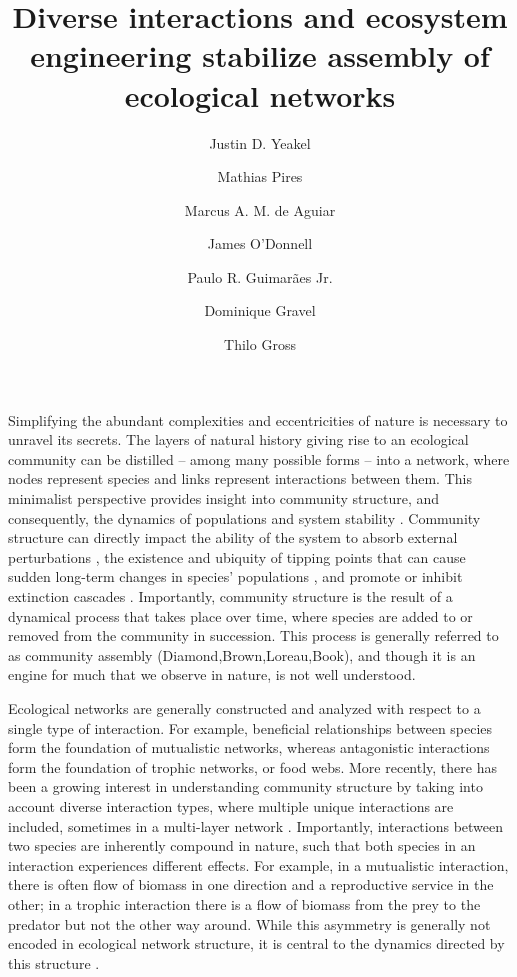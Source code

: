 \documentclass[9pt,twocolumn,twoside]{pnas-new}
\title{Diverse interactions and ecosystem engineering stabilize assembly of ecological networks}
\author[a,b]{Justin D. Yeakel}
\author[c]{Mathias Pires}
\author[c]{Marcus A. M. de Aguiar}
\author[d]{James O'Donnell}
\author[e]{Paulo R. Guimar\~aes Jr.}
\author[f]{Dominique Gravel}
\author[g]{Thilo Gross}
\affil[a]{School of Natural Sciences, University of California Merced, Merced, CA 95343, USA}
\affil[b]{Santa Fe Institute}
\affil[c]{Universidade Estadual de Campinas}
\affil[d]{University of Washington}
\affil[e]{Universidade de S\~ao Paulo}
\affil[f]{Universit\`e de Sherbrooke}
\affil[g]{University of California Davis, Davis CA}
\begin{document}
\verticaladjustment{-2pt}

\maketitle
\thispagestyle{firststyle}


Simplifying the abundant complexities and eccentricities of nature is necessary to unravel its secrets.
The layers of natural history giving rise to an ecological community can be distilled -- among many possible forms -- into a network, where nodes represent species and links represent interactions between them.
This minimalist perspective provides insight into community structure, and consequently, the dynamics of populations and system stability \cite{May1972}.
Community structure can directly impact the ability of the system to absorb external perturbations \cite{Yeakel2014,Novak2016}, the existence and ubiquity of tipping points that can cause sudden long-term changes in species' populations \cite{Lade2011,Boettiger2012}, and promote or inhibit extinction cascades \cite{Stouffer2011}.
Importantly, community structure is the result of a dynamical process that takes place over time, where species are added to or removed from the community in succession.
This process is generally referred to as community assembly (Diamond,Brown,Loreau,Book), and though it is an engine for much that we observe in nature, is not well understood.

Ecological networks are generally constructed and analyzed with respect to a single type of interaction.
For example, beneficial relationships between species form the foundation of mutualistic networks, whereas antagonistic interactions form the foundation of trophic networks, or food webs. %
More recently, there has been a growing interest in understanding community structure by taking into account diverse interaction types, where multiple unique interactions are included, sometimes in a multi-layer network \cite{Kefi2016,Pilosof2017}.
Importantly, interactions between two species are inherently compound in nature, such that both species in an interaction experiences different effects.
For example, in a mutualistic interaction, there is often flow of biomass in one direction and a reproductive service in the other; in a trophic interaction there is a flow of biomass from the prey to the predator but not the other way around.
While this asymmetry is generally not encoded in ecological network structure, it is central to the dynamics directed by this structure \cite{Gross2009,Allesina2012}.
\end{document}
